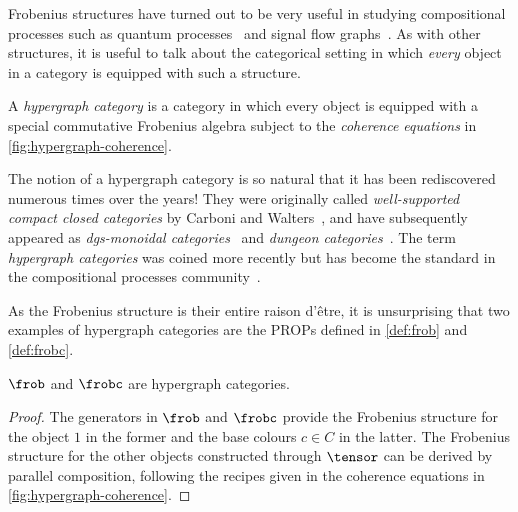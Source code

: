 Frobenius structures have turned out to be very useful in studying compositional
processes such as quantum processes~\cite{coecke2008interacting} and signal flow
graphs~\cite{bonchi2014categorical,bonchi2015full}.
As with other structures, it is useful to talk about the categorical setting in
which \emph{every} object in a category is equipped with such a structure.

\begin{definition}
    \label{def:hypergraph-category}
    A \emph{hypergraph category} is a category in which every object is equipped
    with a special commutative Frobenius algebra subject to the
    \emph{coherence equations} in \cref{fig:hypergraph-coherence}.
\end{definition}



\begin{remark}
    The notion of a hypergraph category is so natural that it has been
    rediscovered numerous times over the years!
    They were originally called \emph{well-supported compact closed categories}
    by Carboni and Walters~\cite{carboni1987cartesian}, and have subsequently
    appeared as
    \emph{dgs-monoidal categories}~\cite{katis1997bicategories,gadducci1998inductive,gadducci1999bicategorical,bruni2002normal}
    and \emph{dungeon categories}~\cite{morton2014belief}.
    The term \emph{hypergraph categories} was coined more recently but has
    become the standard in the compositional processes
    community~\cite{kissinger2015finite,fong2015decorated,baez2016compositional,baez2018compositional}.
\end{remark}

As the Frobenius structure is their entire raison d'\^{e}tre, it is unsurprising
that two examples of hypergraph categories are the PROPs defined in
\cref{def:frob} and \cref{def:frobc}.

\begin{lemma}
    \(\frob\) and \(\frobc\) are hypergraph categories.
\end{lemma}
\begin{proof}
    The generators in \(\frob\) and \(\frobc\) provide the Frobenius
    structure for the object \(1\) in the former and the base colours
    \(c \in C\) in the latter.
    The Frobenius structure for the other objects constructed through
    \(\tensor\) can be derived by parallel composition, following the recipes
    given in the coherence equations in \cref{fig:hypergraph-coherence}.
\end{proof}

